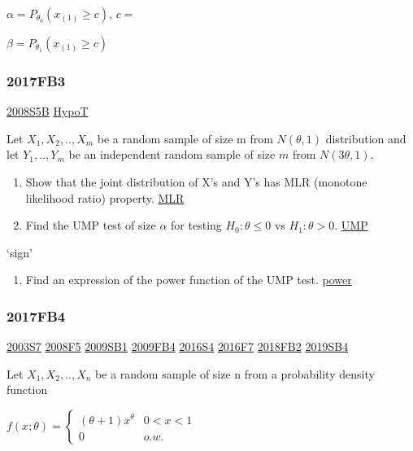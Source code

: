 \documentclass[10pt,twocolumn,portrait]{article}
\providecommand{\tightlist}{%
  \setlength{\itemsep}{0pt}\setlength{\parskip}{0pt}}
\begin{document}
\(\alpha=P_{\theta_0}(x_{(1)}\ge c)\), \(c=\)

\(\beta=P_{\theta_1}(x_{(1)}\ge c)\)

\hypertarget{fb3-3}{%
\subsubsection{2017FB3}\label{fb3-3}}

\protect\hyperlink{s5b}{2008S5B} \protect\hyperlink{HypoT}{HypoT}

Let \(X_1,X_2,..,X_{m}\) be a random sample of size m from
\(N(\theta,1)\) distribution and let \(Y_1,..,Y_m\) be an independent
random sample of size \(m\) from \(N(3\theta,1)\).

\begin{enumerate}
\def\labelenumi{(\alph{enumi})}
\item
  Show that the joint distribution of X's and Y's has MLR (monotone
  likelihood ratio) property. \protect\hyperlink{section-7}{MLR}
\item
  Find the UMP test of size \(\alpha\) for testing \(H_0:\theta\le0\) vs
  \(H_1:\theta>0\). \protect\hyperlink{section-7}{UMP}
\end{enumerate}

`sign'

\begin{enumerate}
\def\labelenumi{(\alph{enumi})}
\setcounter{enumi}{2}
\tightlist
\item
  Find an expression of the power function of the UMP test.
  \protect\hyperlink{power}{power}
\end{enumerate}

\hypertarget{fb4-3}{%
\subsubsection{2017FB4}\label{fb4-3}}

\protect\hyperlink{s7}{2003S7} \protect\hyperlink{f5-3}{2008F5}
\protect\hyperlink{sb1}{2009SB1} \protect\hyperlink{fb4}{2009FB4}
\protect\hyperlink{s4-4}{2016S4} \protect\hyperlink{f7-5}{2016F7}
\protect\hyperlink{fb2-4}{2018FB2} \protect\hyperlink{sb4-2}{2019SB4}

Let \(X_1,X_2,..,X_n\) be a random sample of size n from a probability
density function

\(f(x;\theta)=\begin{cases}(\theta+1)x^\theta& 0<x<1\\0& o.w.\end{cases}\)
\end{document}
